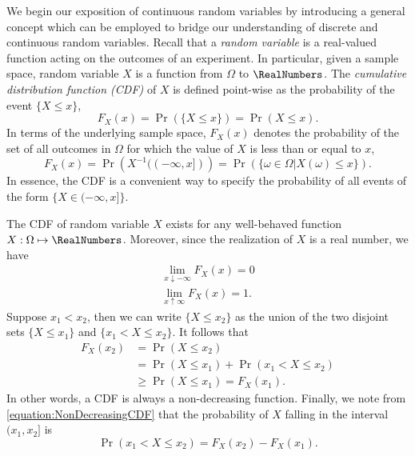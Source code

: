 We begin our exposition of continuous random variables by introducing a general concept which can be employed to bridge our understanding of discrete and continuous random variables.
Recall that a \emph{random variable} is a real-valued function acting on the outcomes of an experiment. 
In particular, given a sample space, random variable $X$ is a function from $\Omega$ to $\RealNumbers$.
The \emph{cumulative distribution function (CDF)} of $X$ is defined point-wise as the probability of the event $\{X \leq x \}$, 
\begin{equation*}
F_X (x) = \Pr ( \{ X \leq x \} ) = \Pr (X \leq x).
\end{equation*}
In terms of the underlying sample space, $F_X (x)$ denotes the probability of the set of all outcomes in $\Omega$ for which the value of $X$ is less than or equal to $x$,
\begin{equation*}
F_X (x) = \Pr \left( X^{-1} ( (- \infty, x]) \right)
= \Pr (\{ \omega \in \Omega | X(\omega) \leq x \}).
\end{equation*}
In essence, the CDF is a convenient way to specify the probability of all events of the form $\{ X \in (-\infty, x] \}$.

The CDF of random variable $X$ exists for any well-behaved function $X : \Omega \mapsto \RealNumbers$.
Moreover, since the realization of $X$ is a real number, we have
\begin{gather*}
\lim_{x \downarrow - \infty} F_X (x) = 0 \\
\lim_{x \uparrow \infty} F_X (x) = 1.
\end{gather*}
Suppose $x_1 < x_2$, then we can write $\{ X \leq x_2 \}$ as the union of the two disjoint sets $\{ X \leq x_1 \}$ and $\{ x_1 < X \leq x_2 \}$.
It follows that
\begin{equation} \label{equation:NonDecreasingCDF}
\begin{split}
F_X (x_2) &= \Pr (X \leq x_2) \\
&= \Pr (X \leq x_1) + \Pr (x_1 < X \leq x_2) \\
&\geq \Pr (X \leq x_1) = F_X (x_1).
\end{split}
\end{equation}
In other words, a CDF is always a non-decreasing function.
Finally, we note from \eqref{equation:NonDecreasingCDF} that the probability of $X$ falling in the interval $(x_1, x_2]$ is
\begin{equation} \label{equation:IntervalCDF}
\Pr (x_1 < X \leq x_2) = F_X (x_2) - F_X (x_1).
\end{equation}


